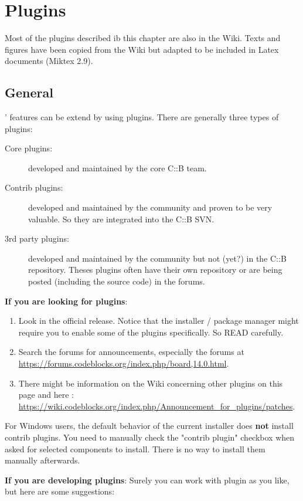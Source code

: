 \chapter{Plugins}\label{sec:plugins}

Most of the plugins described ib this chapter are also in the Wiki. Texts and figures have been copied from the Wiki but adapted to be included in Latex documents (Miktex 2.9).

\section{General}

\codeblocks' features can be extend by using plugins. There are generally three types of plugins:
\begin{description}
\item[Core plugins:] developed and maintained by the core C::B team.
\item[Contrib plugins:] developed and maintained by the community and proven to be very valuable. So they are integrated into the C::B SVN.
\item[3rd party plugins:] developed and maintained by the community but not (yet?) in the C::B repository. Theses plugins often have their own repository or are being posted (including the source code) in the forums.
\end{description}

\textbf{If you are looking for plugins}:
\begin{enumerate}
\item Look in the official release. Notice that the installer / package manager might require you to enable some of the plugins specifically. So READ carefully.
\item Search the forums for announcements, especially the forums at \url{https://forums.codeblocks.org/index.php/board,14.0.html}.
\item There might be information on the Wiki concerning other plugins on this page and here : \url{https://wiki.codeblocks.org/index.php/Announcement_for_plugins/patches}.
\end{enumerate}

For Windows users, the default behavior of the current installer does \textbf{not} install contrib plugins. You need to manually check the "contrib plugin" checkbox when asked for selected components to install. There is no way to install them manually afterwards.


\textbf{If you are developing plugins}: Surely you can work with plugin as you like, but here are some suggestions:

